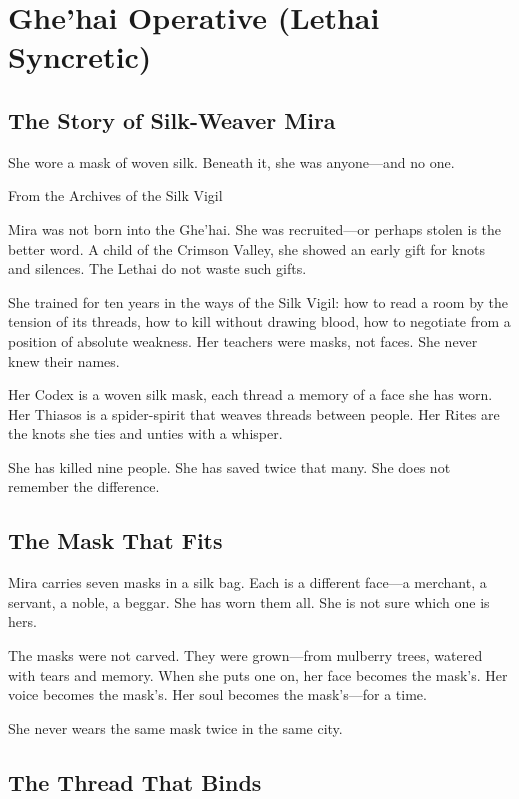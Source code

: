 \section{Ghe'hai Operative (Lethai Syncretic)}

\subsection{The Story of Silk-Weaver Mira}

\epigraph{She wore a mask of woven silk. Beneath it, she was anyone—and no one.}{From the Archives of the Silk Vigil}

Mira was not born into the Ghe'hai. She was recruited—or perhaps stolen is the better word. A child of the Crimson Valley, she showed an early gift for knots and silences. The Lethai do not waste such gifts.

She trained for ten years in the ways of the Silk Vigil: how to read a room by the tension of its threads, how to kill without drawing blood, how to negotiate from a position of absolute weakness. Her teachers were masks, not faces. She never knew their names.

Her Codex is a woven silk mask, each thread a memory of a face she has worn. Her Thiasos is a spider-spirit that weaves threads between people. Her Rites are the knots she ties and unties with a whisper.

She has killed nine people. She has saved twice that many. She does not remember the difference.

\subsection{The Mask That Fits}

Mira carries seven masks in a silk bag. Each is a different face—a merchant, a servant, a noble, a beggar. She has worn them all. She is not sure which one is hers.

The masks were not carved. They were grown—from mulberry trees, watered with tears and memory. When she puts one on, her face becomes the mask's. Her voice becomes the mask's. Her soul becomes the mask's—for a time.

She never wears the same mask twice in the same city.

\subsection{The Thread That Binds}

